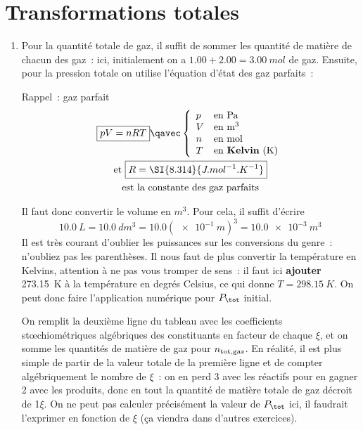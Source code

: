 \documentclass[a4paper, 12pt, final, garamond]{book}
\begin{document}
\section{Transformations totales}
\begin{enumerate}
    \item Pour la quantité totale de gaz, il suffit de sommer les quantité de
        matière de chacun des gaz~: ici, initialement on a
        $\num{1.00}+\num{2.00} = \SI{3.00}{mol}$ de gaz. Ensuite, pour la
        pression totale on utilise l'équation d'état des gaz parfaits~:
        \begin{NCrapp}[]{Rappel~: gaz parfait}
            \begin{gather*}
                \boxed{pV = nRT}
                \qavec
                \left\{
                    \begin{array}{ll}
                        p & \text{en Pa }\\
                        V & \text{en m}^3\\
                        n & \text{en mol}\\
                        T & \text{en \textbf{Kelvin} (K)}
                    \end{array}
                \right.\\
                \text{et }
                \boxed{R = \SI{8.314}{J.mol^{-1}.K^{-1}}}\\
                \text{est la constante des gaz parfaits}
            \end{gather*}
        \end{NCrapp}
        Il faut donc convertir le volume en $\si{m^3}$. Pour cela, il suffit
        d'écrire
        \[\SI{10.0}{L} = \SI{10.0}{dm^3} = \num{10.0}(\SI{e-1}{m})^3 =
        \SI{10.0e-3}{m^3}\]
        Il est très courant d'oublier les puissances sur les conversions du
        genre~: n'oubliez pas les parenthèses. Il nous faut de plus convertir la
        température en Kelvins, attention à ne pas vous tromper de sens~: il
        faut ici \textbf{ajouter} \SI{273.15}{K} à la température en degrés
        Celsius, ce qui donne $T = \SI{298.15}{K}$. On peut donc faire
        l'application numérique pour $P_{\tot}$ initial.\bigbreak

        On remplit la deuxième ligne du tableau avec les coefficients
        stœchiométriques algébriques des constituants en facteur de chaque
        $\xi$, et on somme les quantités de matière de gaz pour $n_{\rm tot,
        gaz}$. En réalité, il est plus simple de partir de la valeur totale de
        la première ligne et de compter algébriquement le nombre de $\xi$~: on
        en perd 3 avec les réactifs pour en gagner 2 avec les produits, donc en
        tout la quantité de matière totale de gaz décroit de 1$\xi$. On ne peut
        pas calculer précisément la valeur de $P_{\tot}$ ici, il faudrait
        l'exprimer en fonction de $\xi$ (ça viendra dans d'autres
        exercices).\bigbreak


\end{enumerate}
\end{document}
